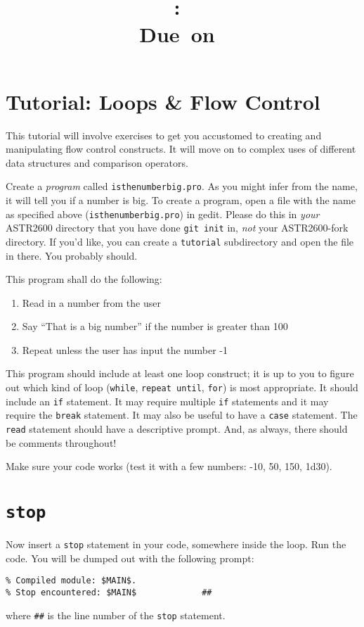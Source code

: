 \documentclass{article}
\title{\vspace{2in}\textmd{\textbf{\hmwkClass:\ \hmwkTitle}}\\\normalsize\vspace{0.1in}\small{Due\ on\ \hmwkDueDate}\\\vspace{0.1in}\large{}\vspace{3in}}
\date{}
\begin{document}
\begin{spacing}{1.0}
\newpage



\section{Tutorial: Loops \& Flow Control}

This tutorial will involve exercises to get you accustomed to creating and
manipulating flow control constructs.  It will move on to complex uses of
different data structures and comparison operators.

Create a \emph{program} called \verb|isthenumberbig.pro|.  As you might infer
from the name, it will tell you if a number is big.  To create a program, open
a file with the name as specified above (\verb|isthenumberbig.pro|) in gedit.
Please do this in \emph{your} ASTR2600 directory that you have done 
\verb|git init| in, \emph{not} your ASTR2600-fork directory.  If you'd like,
you can create a \verb|tutorial| subdirectory and open the file in there.  You
probably should.

This program shall do the following:
\begin{enumerate}
    \item Read in a number from the user
    \item Say ``That is a big number'' if the number is greater than 100
    \item Repeat unless the user has input the number -1
\end{enumerate}

This program should include at least one loop construct; it is up to you to
figure out which kind of loop (\verb|while|, \verb|repeat until|, \verb|for|)
is most appropriate.  It should include an \verb|if| statement.  It may require
multiple \verb|if| statements and it may require the \verb|break| statement.
It may also be useful to have a \verb|case| statement.  The \verb|read|
statement should have a descriptive prompt.  And, as always, there should be
comments throughout!

Make sure your code works (test it with a few numbers: -10, 50, 150, 1d30).

\section{\texttt{stop}}
Now insert a \verb|stop| statement in your code, somewhere inside the loop.
Run the code.  You will be dumped out with the following prompt:
\begin{lstlisting}
% Compiled module: $MAIN$.
% Stop encountered: $MAIN$             ##
\end{lstlisting}   
where \verb|##| is the line number of the \verb|stop| statement.


\end{spacing}
\end{document}
